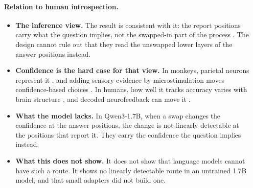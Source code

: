 \documentclass[11pt]{article}
\begin{document}
\paragraph{Relation to human introspection.}
\begin{itemize}
\item \textbf{The inference view.} The result is consistent with it: the report positions carry what the question implies, not the swapped-in part of the process \citep{nisbett1977telling,carruthers2011opacity}. The design cannot rule out that they read the unswapped lower layers of the answer positions instead.
\item \textbf{Confidence is the hard case for that view.} In monkeys, parietal neurons represent it \citep{kiani2009representation}, and adding sensory evidence by microstimulation moves confidence-based choices \citep{fetsch2014effects}. In humans, how well it tracks accuracy varies with brain structure \citep{fleming2010relating}, and decoded neurofeedback can move it \citep{cortese2016multivoxel}.
\item \textbf{What the model lacks.} In Qwen3-1.7B, when a swap changes the confidence at the answer positions, the change is not linearly detectable at the positions that report it. They carry the confidence the question implies instead.
\item \textbf{What this does not show.} It does not show that language models cannot have such a route. It shows no linearly detectable route in an untrained 1.7B model, and that small adapters did not build one.
\end{itemize}
\end{document}
